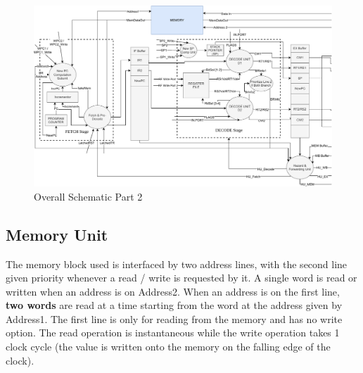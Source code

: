 \documentclass[12pt]{article}
\theoremstyle{plain}
\theoremstyle{definition}
\begin{document}
    \begin{figure}
        \centering
        \includegraphics[page=2]{Diagrams/SystemOverviewSplit}
        \caption{Overall Schematic Part 2}
        \label{sys-schematic-2}
    \end{figure}

\subsection{Memory Unit}
The memory block used is interfaced by two address lines, with the second line given priority whenever a read / write is requested by it. A single word is read or written when an address is on Address2. When an address is on the first line, \textbf{two words} are read at a time starting from the word at the address given by Address1. The first line is only for reading from the memory and has no write option. The read operation is instantaneous while the write operation takes 1 clock cycle (the value is written onto the memory on the falling edge of the clock). 
\end{document}
